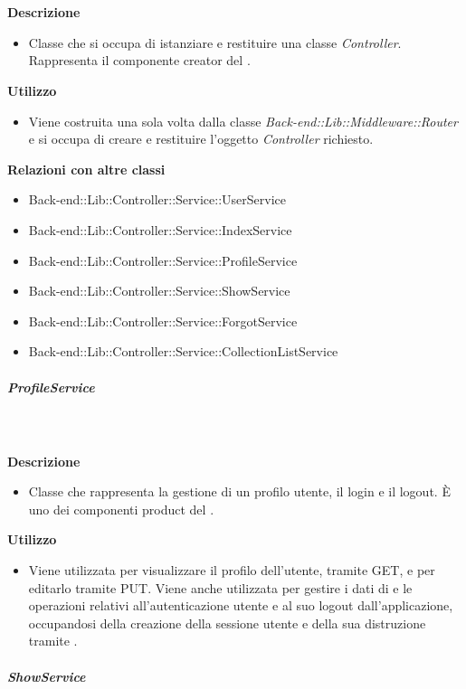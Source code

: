 				\textbf{\\ \\ Descrizione} 
					\begin{itemize}
						\item[] Classe che si occupa di istanziare e restituire una classe \textit{Controller}. Rappresenta il componente creator del  .
					\end{itemize}      
				\textbf{Utilizzo}  
					\begin{itemize}
						\item[] Viene costruita una sola volta dalla classe \textit{Back-end::Lib::Middleware::Router} e si occupa di creare e restituire l'oggetto \textit{Controller} richiesto.
					\end{itemize}
					\textbf{Relazioni con altre classi}
					\begin{itemize}
							\item{Back-end::Lib::Controller::Service::UserService}
							\item{Back-end::Lib::Controller::Service::IndexService}
							\item{Back-end::Lib::Controller::Service::ProfileService}
							\item{Back-end::Lib::Controller::Service::ShowService}
							\item{Back-end::Lib::Controller::Service::ForgotService}
							\item{Back-end::Lib::Controller::Service::CollectionListService}
					\end{itemize}
			\subparagraph{ProfileService}
				
				\textbf{\\ \\ Descrizione} 
					\begin{itemize}
						\item[] Classe che rappresenta la gestione di un profilo utente, il login e il logout. È uno dei componenti product del  .

					\end{itemize}      
				\textbf{Utilizzo}  
					\begin{itemize}
						\item[] Viene utilizzata per visualizzare il profilo dell'utente, tramite GET, e per editarlo tramite PUT. Viene anche utilizzata per gestire i dati di e le operazioni relativi all'autenticazione utente e al suo logout dall'applicazione, occupandosi della creazione della sessione utente e della sua distruzione tramite .
					\end{itemize}
			\subparagraph{ShowService}
				
